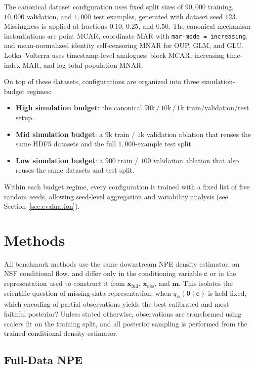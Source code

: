 \documentclass{article} %
\providecommand{\xfull}{\mathbf{x}_{\mathrm{full}}}
\providecommand{\xobs}{\mathbf{x}_{\mathrm{obs}}}
\providecommand{\mvec}{\mathbf{m}}
\providecommand{\thetab}{\boldsymbol{\theta}}
\providecommand{\phib}{\boldsymbol{\phi}}
\begin{document}
The canonical dataset configuration uses fixed split sizes of $90{,}000$ training,
$10{,}000$ validation, and $1{,}000$ test examples, generated with dataset seed
$123$. Missingness is applied at fractions $0.10$, $0.25$, and $0.50$. The
canonical mechanism instantiations are point MCAR, coordinate MAR with
\texttt{mar-mode = increasing}, and mean-normalized identity self-censoring MNAR
for OUP, GLM, and GLU. Lotka--Volterra uses timestamp-level analogues: block
MCAR, increasing time-index MAR, and log-total-population MNAR.

On top of these datasets, configurations are organized into three
simulation-budget regimes:
\begin{itemize}
  \item \textbf{High simulation budget}: the canonical
  $90$k\,/\,$10$k\,/\,$1$k train/validation/test setup.
  \item \textbf{Mid simulation budget}: a $9$k train / $1$k validation ablation
  that reuses the same HDF5 datasets and the full $1{,}000$-example test split.
  \item \textbf{Low simulation budget}: a $900$ train / $100$ validation
  ablation that also reuses the same datasets and test split.
\end{itemize}

Within each budget regime, every configuration is trained with a fixed list of
five random seeds, allowing seed-level aggregation and variability analysis (see
Section~\ref{sec:evaluation}).

\section{Methods}
\label{sec:methods}

All benchmark methods use the same downstream NPE density estimator, an NSF
conditional flow, and differ only in the conditioning variable $\mathbf{c}$ or in
the representation used to construct it from $\xfull$, $\xobs$, and $\mvec$.
This isolates the scientific question of missing-data representation: when
$q_{\phib}(\thetab \mid \mathbf{c})$ is held fixed, which encoding of partial
observations yields the best calibrated and most faithful posterior? Unless
stated otherwise, observations are transformed using scalers fit on the training
split, and all posterior sampling is performed from the trained conditional
density estimator.

\subsection{Full-Data NPE}
\label{sec:method-full-data}
\end{document}
